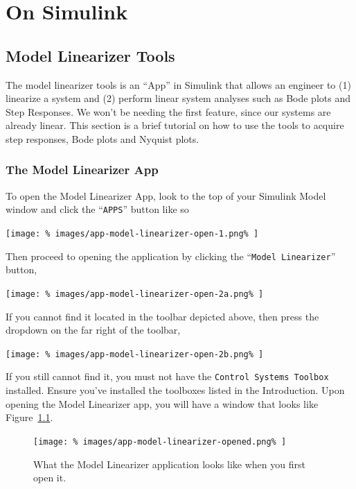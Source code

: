 \chapter{On Simulink}\label{App:Simulink}

\section{Model Linearizer Tools}\label{App:Simulink:ModelLinearizer}
The model linearizer tools is an ``App'' in Simulink that allows an engineer to
(1) linearize a system and (2) perform linear system analyses such as Bode
plots and Step Responses. We won't be needing the first feature, since our
systems are already linear. This section is a brief tutorial on how to use
the tools to acquire step responses, Bode plots and Nyquist plots.

\subsection{The Model Linearizer App}
To open the Model Linearizer App, look to the top of your Simulink Model
window and click the ``\texttt{APPS}'' button like so
%
\begin{center}
  \texttt{[image: \%
    images/app-model-linearizer-open-1.png\%
  ]}
\end{center}
%
Then proceed to opening the application by clicking the ``\texttt{Model
Linearizer}'' button,
%
\begin{center}
  \texttt{[image: \%
    images/app-model-linearizer-open-2a.png\%
  ]}
\end{center}
%
If you cannot find it located in the toolbar depicted above, then press the
dropdown on the far right of the toolbar,
%
\begin{center}
  \texttt{[image: \%
    images/app-model-linearizer-open-2b.png\%
  ]}
\end{center}
%
If you still cannot find it, you must not have the \texttt{Control Systems
Toolbox} installed. Ensure you've installed the toolboxes listed in the
Introduction. Upon opening the Model Linearizer app, you
will have a window that looks like Figure~\ref{fig:app1:model-linearizer}.
%
\begin{figure}[H]
  \centering
  \texttt{[image: \%
    images/app-model-linearizer-opened.png\%
  ]}
  \caption[The Model Linearizer App]{%
    What the Model Linearizer application looks like when you first open it.%
  }
  \label{fig:app1:model-linearizer}
\end{figure}

